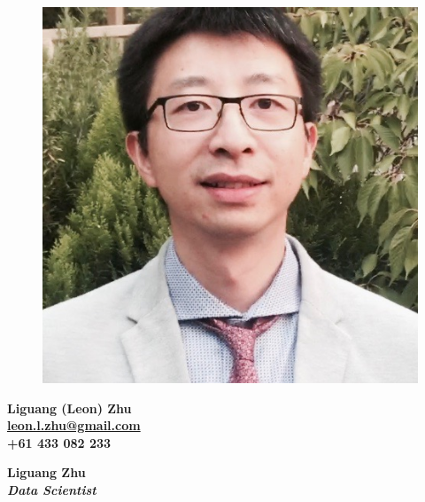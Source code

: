 \documentclass[a4paper,8pt,final]{memoir}
\newcommand{\Sep}{\vspace{1.5em}}
\newcommand{\SmallSep}{\vspace{0.5em}}
\newenvironment{Highlights}
	{\ignorespaces\textbf{\color{RoyalBlue} Highlights}}
	{\Sep\ignorespacesafterend}
\newcommand{\CVSection}[1]
	{\Large\textbf{#1}\par
	\SmallSep\normalsize\normalfont}
\newcommand{\CVItem}[1]
	{\textbf{\color{RoyalBlue} #1}}
\begin{document}
\begin{figure}
	\hfill
	\includegraphics[width=0.6\columnwidth]{me}
	\vspace{-7cm}
\end{figure}

\begin{flushright}\small
\textbf{
	Liguang (Leon) Zhu \\
	\url{leon.l.zhu@gmail.com}  \\
	+61 433 082 233}
\end{flushright}\normalsize
%

\framebreak


\Huge\bfseries {\color{RoyalBlue} Liguang Zhu} \\
\Large\bfseries {\em Data Scientist} \\

\normalsize\normalfont

\end{document}
